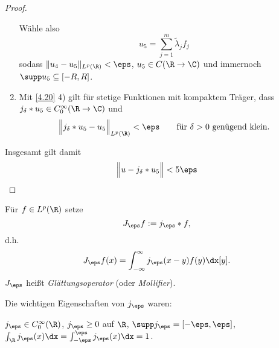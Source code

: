 \begin{st}
\begin{proof}
\begin{enumerate}[1)]
				Wähle also
				\[
					u_5 = \sum_{j=1}^m \tilde \lambda_j f_j
				\]
				sodass $\|u_4 - u_5\|_{L^p(\R)} < \eps$, $u_5 \in C(\R \to \C)$ und immernoch $\supp u_5 \subset [-R,R]$.
			\item
				Mit \ref{4.20} 4) gilt für stetige Funktionen mit kompaktem Träger, dass $j_\delta \ast u_5 \in C_0^\infty(\R \to \C)$ und
				\[
					\Big\|j_\delta \ast u_5 - u_5 \Big\|_{L^p(\R)} < \eps \qquad \text{für $\delta > 0$ genügend klein.}
				\]
		\end{enumerate}
		Insgesamt gilt damit
		\[
			\Big\|u - j_\delta \ast u_5 \Big\| < 5\eps
		\]
	\end{proof}
\end{st}

\begin{df} \label{4.19}
	Für $f \in L^p(\R)$ setze
	\[
		J_\eps f := j_\eps \ast f,
	\]
	d.h.
	\[
		J_\eps f(x) = \int_{-\infty}^\infty j_\eps (x-y) f(y) \dx[y].
	\]
	$J_\eps$ heißt \emph{Glättungsoperator} (oder \emph{Mollifier}).
	\begin{note}
		Die wichtigen Eigenschaften von $j_\eps$ waren:

		$j_\eps \in C_0^\infty(\R)$, $j_\eps \ge 0$ auf $\R$, $\supp j_\eps = [-\eps,\eps]$, $\int_{\R} j_\eps(x) \dx = \int_{-\eps}^\eps j_\eps(x) \dx = 1$.
	\end{note}
\end{df}


